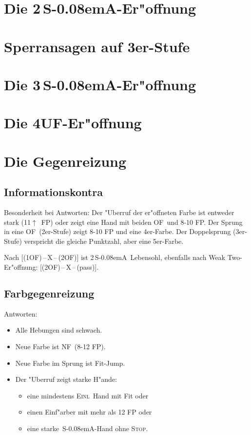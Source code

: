 \documentclass[11pt,german,twocolumn]{scrartcl}
\def\pl{$\uparrow$}
\def\ufa{\textsf{UF}}
\def\ofa{\textsf{OF}}
\def\SA{\textsf{\,S\kern-0.08emA}}
\def\kontra{\textsf{X}}
\def\sep{\,--\,}
\def\inv{\textsc{Einl}}
\def\nf{\textsc{NF}}
\def\stp{\textsc{Stop}}
\begin{document}
\section{Die 2\SA-Er"offnung}

\section{Sperransagen auf 3er-Stufe}

\section{Die 3\SA-Er"offnung}

\section{Die 4\ufa-Er"offnung}

\section{Die Gegenreizung}

\subsection{Informationskontra}

Besonderheit bei Antworten: Der "Uberruf der er"offneten Farbe ist entweder
stark (11\pl\ FP) oder zeigt eine Hand mit beiden \ofa\ und 8-10 FP. Der Sprung
in eine \ofa\ (2er-Stufe) zeigt 8-10 FP und eine 4er-Farbe. Der Doppelsprung
(3er-Stufe) verspricht die gleiche Punktzahl, aber eine 5er-Farbe.

Nach [(1\ofa)\sep\kontra\sep(2\ofa)] ist 2\SA\ Lebensohl, ebenfalls nach Weak Two-
Er"offnung: [(2\ofa)\sep\kontra\sep(pass)].

\subsection{Farbgegenreizung}

Antworten:

\begin{itemize}
\item Alle Hebungen sind schwach.
\item Neue Farbe ist \nf\ (8-12 FP).
\item Neue Farbe im Sprung ist Fit-Jump.
\item Der "Uberruf zeigt starke H"ande:
  \begin{itemize}
  \item eine mindestens \inv\ Hand mit Fit oder
  \item einen Einf"arber mit mehr als 12 FP oder
  \item eine starke \SA-Hand ohne \stp.
  \end{itemize}
\end{itemize}
\end{document}
